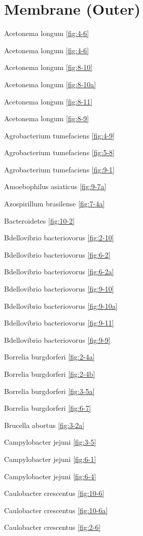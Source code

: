 \documentclass[]{tufte-book}
\begin{document}
\section{\texorpdfstring{\textbf{Membrane
(Outer)}}{Membrane (Outer)}}\label{membrane-outer}

Acetonema longum \ref{fig:4-6}

Acetonema longum \ref{fig:4-6}

Acetonema longum \ref{fig:8-10}

Acetonema longum \ref{fig:8-10a}

Acetonema longum \ref{fig:8-11}

Acetonema longum \ref{fig:8-9}

Agrobacterium tumefaciens \ref{fig:4-9}

Agrobacterium tumefaciens \ref{fig:5-8}

Agrobacterium tumefaciens \ref{fig:9-1}

Amoebophilus asiaticus \ref{fig:9-7a}

Azospirillum brasilense \ref{fig:7-4a}

Bacteroidetes \ref{fig:10-2}

Bdellovibrio bacteriovorus \ref{fig:2-10}

Bdellovibrio bacteriovorus \ref{fig:6-2}

Bdellovibrio bacteriovorus \ref{fig:6-2a}

Bdellovibrio bacteriovorus \ref{fig:9-10}

Bdellovibrio bacteriovorus \ref{fig:9-10a}

Bdellovibrio bacteriovorus \ref{fig:9-11}

Bdellovibrio bacteriovorus \ref{fig:9-9}

Borrelia burgdorferi \ref{fig:2-4a}

Borrelia burgdorferi \ref{fig:2-4b}

Borrelia burgdorferi \ref{fig:3-5a}

Borrelia burgdorferi \ref{fig:6-7}

Brucella abortus \ref{fig:3-2a}

Campylobacter jejuni \ref{fig:3-5}

Campylobacter jejuni \ref{fig:6-1}

Campylobacter jejuni \ref{fig:6-4}

Caulobacter crescentus \ref{fig:10-6}

Caulobacter crescentus \ref{fig:10-6a}

Caulobacter crescentus \ref{fig:2-6}
\end{document}
